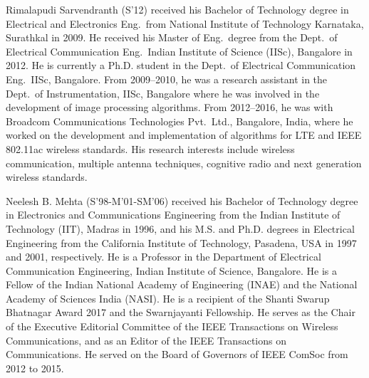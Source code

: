 \documentclass[journal]{IEEEtran}
\begin{document}
\begin{IEEEbiography}{Rimalapudi Sarvendranth} (S'12)
	received his Bachelor of Technology degree in Electrical and Electronics Eng.\ from National Institute of Technology Karnataka, Surathkal in 2009. He received his Master of Eng.\ degree from the Dept.\ of Electrical Communication Eng.\, Indian Institute of Science (IISc), Bangalore in 2012. He is currently a Ph.D. student in the Dept.\ of  Electrical   Communication  Eng.\, IISc, Bangalore. From 2009--2010, he was a research assistant in the  Dept.\ of Instrumentation, IISc, Bangalore where he was involved in the  development of image processing algorithms. From 2012--2016, he was with Broadcom Communications Technologies Pvt.\ Ltd., Bangalore, India, where he worked on the development and implementation of algorithms for LTE and IEEE 802.11ac wireless standards.  His research interests include wireless communication, multiple antenna techniques, cognitive radio and next generation wireless standards.
\end{IEEEbiography}

\begin{IEEEbiography}
	{Neelesh B. Mehta} (S'98-M'01-SM'06) received his Bachelor of Technology degree in Electronics and Communications Engineering from the Indian Institute of Technology (IIT), Madras in 1996, and his M.S. and Ph.D. degrees in Electrical Engineering from the California Institute of Technology, Pasadena, USA in 1997 and 2001, respectively. He is a Professor in the Department of Electrical Communication Engineering, Indian Institute of Science, Bangalore. He is a Fellow of the Indian National Academy of Engineering (INAE) and the National Academy of Sciences India (NASI). He is a recipient of the Shanti Swarup Bhatnagar Award 2017 and the Swarnjayanti Fellowship. He serves as the Chair of the Executive Editorial Committee of the IEEE Transactions on Wireless Communications, and as an Editor of the IEEE Transactions on Communications. He served on the Board of Governors of IEEE ComSoc from 2012 to 2015.
\end{IEEEbiography}
\end{document}
